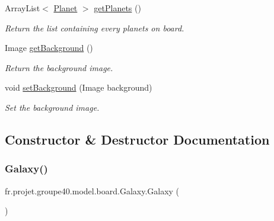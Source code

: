 \begin{DoxyCompactItemize}
Array\+List$<$ \hyperlink{classfr_1_1projet_1_1groupe40_1_1model_1_1board_1_1_planet}{Planet} $>$ \hyperlink{classfr_1_1projet_1_1groupe40_1_1model_1_1board_1_1_galaxy_ab6db29c36ed37b5c2e6c08ee62cd9040}{get\+Planets} ()
\begin{DoxyCompactList}\small\item\em Return the list containing every planets on board. \end{DoxyCompactList}\item 
Image \hyperlink{classfr_1_1projet_1_1groupe40_1_1model_1_1board_1_1_galaxy_afcccc9ebe565d321f0c6bf1cd49e4676}{get\+Background} ()
\begin{DoxyCompactList}\small\item\em Return the background image. \end{DoxyCompactList}\item 
void \hyperlink{classfr_1_1projet_1_1groupe40_1_1model_1_1board_1_1_galaxy_adcb4e80619863342931153460e92f4a7}{set\+Background} (Image background)
\begin{DoxyCompactList}\small\item\em Set the background image. \end{DoxyCompactList}\end{DoxyCompactItemize}


\subsection{Constructor \& Destructor Documentation}
\mbox{\label{classfr_1_1projet_1_1groupe40_1_1model_1_1board_1_1_galaxy_a9fc182ce74a25f23495edadbac56e787}} 
\subsubsection{\texorpdfstring{Galaxy()}{Galaxy()}\hspace{0.1cm}{\footnotesize\ttfamily [1/3]}}
{\footnotesize\ttfamily fr.\+projet.\+groupe40.\+model.\+board.\+Galaxy.\+Galaxy (\begin{DoxyParamCaption}{ }\end{DoxyParamCaption})}



